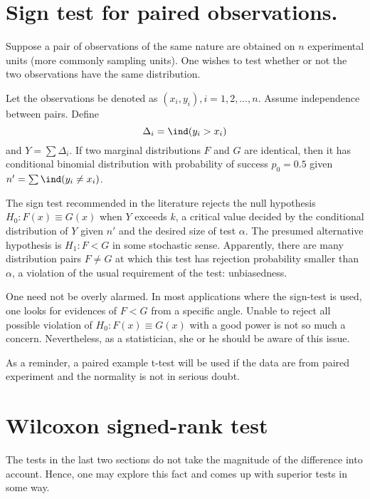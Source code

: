 \section{Sign test for paired observations.}

Suppose a pair of observations of the same nature are obtained on
$n$ experimental units (more commonly sampling units).
One wishes to test whether or not the two observations
have the same distribution.

Let the observations be denoted as $(x_i, y_i), i=1, 2, \ldots, n$.
Assume independence between pairs.
Define
\[
\Delta_i = \ind( y_i > x_i)
\]
and $Y = \sum \Delta_i$. If two marginal distributions
$F$ and $G$ are identical, then it has conditional binomial distribution with
probability of success $p_0 = 0.5$ given $n' = \sum  \ind( y_i \neq x_i)$.

The sign test recommended in the literature
rejects the null hypothesis $H_0: F(x) \equiv G(x)$
when $Y$ exceeds $k$, a critical value decided by 
the conditional distribution of $Y$ given $n'$ and the desired
size of test $\alpha$. The presumed alternative hypothesis
is $H_1: F < G$ in some stochastic sense. 
Apparently, there are many distribution pairs
$F \neq G$ at which this test has rejection probability
smaller than $\alpha$, a violation of the usual
requirement of the test: unbiasedness.

One need not be overly alarmed. In most applications
where the sign-test is used, one looks for evidences
of $F < G$ from a specific angle. Unable to reject
all possible violation of $H_0: F(x) \equiv G(x)$
with a good power is not so much a concern.
Nevertheless, as a statistician, she or he should 
be aware of this issue.

As a reminder, a paired example t-test will be used if the data are from paired
experiment and the normality is not in serious doubt.

\section{Wilcoxon signed-rank test}

The tests in the last two sections do not take the magnitude
of the difference into account. Hence, one may explore this
fact and comes up with superior tests in some way.

